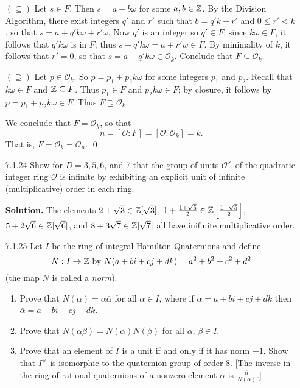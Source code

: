 \begin{enumerate}
      $(\subseteq)$ Let $s \in F$. Then $s = a + b\omega$ for some
      $a, b \in \mathbb{Z}$. By the Division Algorithm, there exist integers $q'$ and 
      $r'$ such that $b = q'k + r'$ and $0 \le r' < k$, so that
      $s = a + q'k\omega + r'\omega$. Now $q'$ is an integer so $q' \in F$; 
      since $k\omega \in F$, it follows that $q'k\omega$ is in $F$; thus
      $s - q'k\omega = a + r'w \in F$. By minimality of $k$, it follows that
      $r' = 0$, so that $s = a + q'k\omega \in \mathcal{O}_k$. Conclude that
      $F \subseteq \mathcal{O}_k$.

      $(\supseteq)$ Let $p \in \mathcal{O}_k$. So $p = p_1 + p_2k\omega$ for
      some integers $p_1$ and $p_2$. Recall that $k\omega \in F$ and
      $\mathbb{Z} \subseteq F$. Thus $p_1 \in F$ and $p_2k\omega \in F$; by closure, it
      follows by $p = p_1 + p_2k\omega \in F$. Thus $F \supseteq \mathcal{O}_k$.

      We conclude that $F = \mathcal{O}_k$, so that
      $$n = [\mathcal{O} : F] = [\mathcal{O} : \mathcal{O}_k] = k.$$
      That is, $F = \mathcal{O}_k = \mathcal{O}_n$. \qed
   \item[7.1.24]  Show for $D = 3, 5, 6$, and 7 that the group of units
                  $\mathcal{O}^\times$ of the quadratic integer ring
                  $\mathcal{O}$  is infinite by exhibiting an explicit unit of
                  infinite (multiplicative) order in each ring.

      \textbf{Solution.} The elements $2 + \sqrt{3} \in \mathbb{Z}[\sqrt{3}]$,
      $1 + \frac{1 + \sqrt{5}}{2} \in \mathbb{Z}\left[\frac{1 + \sqrt{5}}{2}\right]$,
      $5 + 2\sqrt{6} \in \mathbb{Z}[\sqrt{6}]$, and $8 + 3\sqrt{7} \in \mathbb{Z}[\sqrt{7}]$ all
      have inifinite multiplicative order.      
   \item[7.1.25]  Let $I$ be the ring of integral Hamilton Quaternions and
                  define
                  $$N : I \rightarrow \mathbb{Z} \text{ by }
                    N(a + bi + cj + dk) = a^2 + b^2 + c^2 + d^2$$
                  (the map $N$ is called a \textit{norm}).
                  \begin{enumerate}
                     \item Prove that $N(\alpha) = \alpha\overline{\alpha}$ for
                           all $\alpha \in I$, where if
                           $\alpha = a + bi + cj + dk$ then
                           $\overline{\alpha} = a - bi - cj - dk$.
                     \item Prove that $N(\alpha\beta) = N(\alpha)N(\beta)$ for
                           all $\alpha$, $\beta \in I$.
                     \item Prove that an element of $I$ is a unit if and only if
                           it has norm $+1$. Show that $I^\times$ is isomorphic
                           to the quaternion group of order 8. [The inverse in
                           the ring of rational quaternions of a nonzero element
                           $\alpha$ is $\frac{\overline{\alpha}}{N(\alpha)}$.]
                  \end{enumerate}


\end{enumerate}
